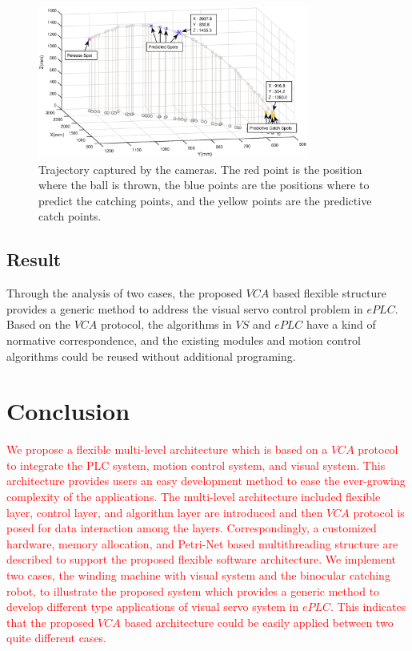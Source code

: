 \documentclass[journal,UTF8]{IEEEtran}
\begin{document}
\begin{figure}
	\centering
	\includegraphics[width=3.5in]{fig/PFofRobot.eps}
	\caption{ Trajectory captured by the cameras. The red point is the position where the ball is thrown, the blue points are the positions where to predict the catching points, and the yellow points are the predictive catch points.}
	\label{fig:Trajectory}
\end{figure}

\subsection{Result}
Through the analysis of two cases, the proposed $VCA$ based flexible structure provides a generic method to address the visual servo control problem in $ePLC$. Based on the $VCA$ protocol, the algorithms in $VS$ and $ePLC$ have a kind of normative correspondence,  and the existing modules and motion control algorithms could be reused without additional programing. 
\section{Conclusion}
\label{conclusion}
\textcolor{red}{We propose a flexible multi-level architecture which is based on a $VCA$ protocol to integrate the PLC system, motion control system, and visual system. This architecture provides users an easy development method to ease the ever-growing complexity of the applications. The multi-level architecture included flexible layer, control layer, and algorithm layer are introduced and then $VCA$ protocol is posed for data interaction among the layers. Correspondingly, a customized hardware, memory allocation, and Petri-Net based multithreading structure are described to support the proposed flexible software architecture. We implement two cases, the winding machine with visual system and the binocular catching robot, to illustrate the proposed system which provides a generic method to develop different type applications of visual servo system in $ePLC$. This indicates that the proposed $VCA$ based architecture could be easily applied between two quite different cases.}
\end{document}
